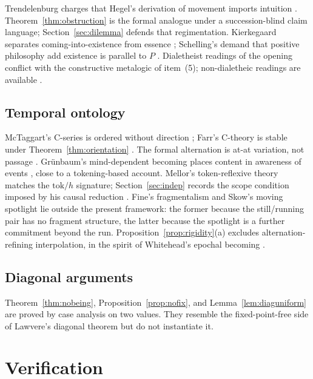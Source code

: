 \documentclass[11pt]{article}
\begin{document}
Trendelenburg charges that Hegel's derivation of movement imports intuition \cite{trendelenburg1870}. Theorem~\ref{thm:obstruction} is the formal analogue under a succession-blind claim language; Section~\ref{sec:dilemma} defends that regimentation. Kierkegaard separates coming-into-existence from essence \cite{kierkegaard1844,kierkegaard1846}; Schelling's demand that positive philosophy add existence is parallel to $P$ \cite{schelling1994}. Dialetheist readings of the opening \cite{priest2006} conflict with the constructive metalogic of item~(5); non-dialetheic readings are available \cite{ficara2020,berto2007}.

\subsection{Temporal ontology}
McTaggart's C-series is ordered without direction \cite{mctaggart1908}; Farr's C-theory is stable under Theorem~\ref{thm:orientation} \cite{farr2020}. The formal alternation is at-at variation, not passage \cite{williams1951,smart1949,broad1923,prior1959}. Grünbaum's mind-dependent becoming places content in awareness of events \cite{grunbaum1967}, close to a tokening-based account. Mellor's token-reflexive theory matches the $\mathrm{tok}/h$ signature; Section~\ref{sec:indep} records the scope condition imposed by his causal reduction \cite{mellor1998}. Fine's fragmentalism \cite{fine2005} and Skow's moving spotlight \cite{skow2015} lie outside the present framework: the former because the still/running pair has no fragment structure, the latter because the spotlight is a further commitment beyond the run. Proposition~\ref{prop:rigidity}(a) excludes alternation-refining interpolation, in the spirit of Whitehead's epochal becoming \cite{whitehead1929}.

\subsection{Diagonal arguments}
Theorem~\ref{thm:nobeing}, Proposition~\ref{prop:nofix}, and Lemma~\ref{lem:diaguniform} are proved by case analysis on two values. They resemble the fixed-point-free side of Lawvere's diagonal theorem \cite{lawvere1969,cantor1891,godel1931} but do not instantiate it.

\section{Verification}
\label{sec:mech}
\end{document}
